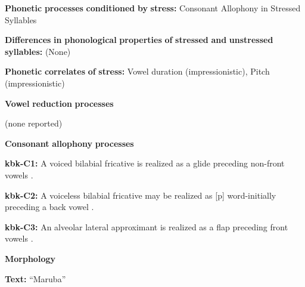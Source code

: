 \begin{styleBody}
\textbf{Phonetic} \textbf{processes} \textbf{conditioned} \textbf{by} \textbf{stress:} Consonant Allophony in Stressed Syllables
\end{styleBody}

\begin{styleBody}
\textbf{Differences} \textbf{in} \textbf{phonological} \textbf{properties} \textbf{of} \textbf{stressed} \textbf{and} \textbf{unstressed} \textbf{syllables:} (None) 
\end{styleBody}

\begin{styleBody}
\textbf{Phonetic} \textbf{correlates} \textbf{of} \textbf{stress:} Vowel duration (impressionistic), Pitch (impressionistic)
\end{styleBody}

\begin{styleBody}
\textbf{Vowel} \textbf{reduction} \textbf{processes}
\end{styleBody}

\begin{styleBody}
(none reported)
\end{styleBody}

\begin{styleBody}
\textbf{Consonant} \textbf{allophony} \textbf{processes}
\end{styleBody}

\begin{styleBody}
\textbf{kbk-C1:} A voiced bilabial fricative is realized as a glide preceding non-front vowels \citep{Dutton1996}.
\end{styleBody}

\begin{styleBody}
\textbf{kbk-C2:} A voiceless bilabial fricative may be realized as [p] word-initially preceding a back vowel \citep{Dutton1996}.
\end{styleBody}

\begin{styleBody}
\textbf{kbk-C3:} An alveolar lateral approximant is realized as a flap preceding front vowels \citep{Dutton1996}.
\end{styleBody}

\begin{styleBody}
\textbf{Morphology}
\end{styleBody}

\begin{styleBody}
\textbf{Text:} “Maruba” \citep[72-76]{Dutton1996}
\end{styleBody}


